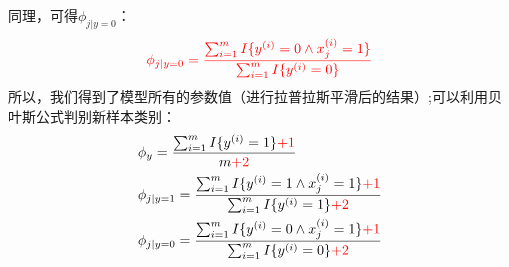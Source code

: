 同理，可得$\phi_{j|y=0}$：
\begin{equation}\nonumber
\begin{split}
  &{\color{red}{\phi_{j|y=0}=\frac{\sum_{i=1}^{m}I\{y^{(i)}=0\wedge x_j^{(i)}=1\}}  {\sum_{i=1}^{m}I\{y^{(i)}=0\}}}}\\
\end{split}
\end{equation}
所以，我们得到了模型所有的参数值（进行拉普拉斯平滑后的结果）;可以利用贝叶斯公式判别新样本类别：
\begin{equation}\nonumber
\begin{split}
  &\phi_y = \frac{\sum_{i=1}^{m}I\{y^{(i)}=1\}{\color{red}{+1}}}{m{\color{red}{+2}}}\\
  &\phi_{j|y=1}=\frac{\sum_{i=1}^{m}I\{y^{(i)}=1\wedge x_j^{(i)}=1\}{\color{red}{+1}}}{\sum_{i=1}^{m}I\{y^{(i)}=1\}{\color{red}{+2}}}\\
  &\phi_{j|y=0}=\frac{\sum_{i=1}^{m}I\{y^{(i)}=0\wedge x_j^{(i)}=1\}{\color{red}{+1}}}{\sum_{i=1}^{m}I\{y^{(i)}=0\}{\color{red}{+2}}}\\
\end{split}
\end{equation}



